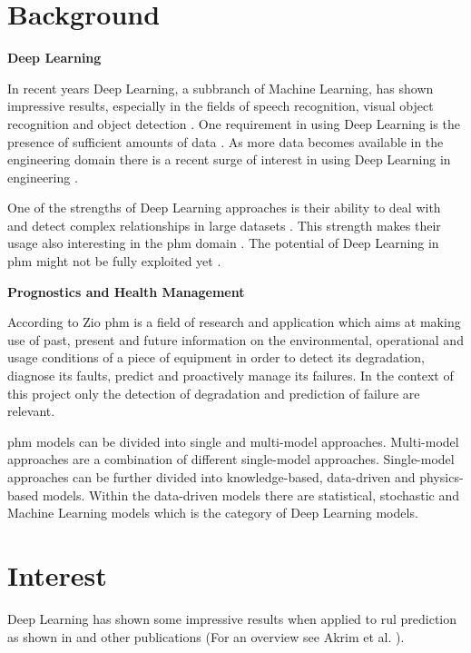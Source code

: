 \documentclass[conference]{IEEEtran}
\begin{document}
\IEEEpeerreviewmaketitle

\section{Background}
\label{sec:background}

\noindent
\textbf{Deep Learning}

In recent years Deep Learning, a subbranch of Machine Learning, has shown impressive results, especially in the fields of speech recognition, visual object recognition and object detection \cite{LeCun2015}. One requirement in using Deep Learning is the presence of sufficient amounts of data \cite{Sikorska2011}. As more data becomes available in the engineering domain there is a recent surge of interest in using Deep Learning in engineering \cite{Voulodimos2018}.

One of the strengths of Deep Learning approaches is their ability to deal with and detect complex relationships in large datasets \cite{MONTEROJIMENEZ2020539}. This strength makes their usage also interesting in the \gls{phm} domain \cite{Wu2015}. The potential of Deep Learning in \gls{phm} might not be fully exploited yet \cite{Akrim2021}.

\noindent
\textbf{Prognostics and Health Management}

According to Zio \cite{Zio2012} \gls{phm} is a field of research and application which aims at making use of past, present and future information on the environmental, operational and usage conditions of a piece of equipment in order to detect its degradation, diagnose its faults, predict and proactively manage its failures. In the context of this project only the detection of degradation and prediction of failure are relevant.

\gls{phm} models can be divided into single and multi-model approaches. Multi-model approaches are a combination of different single-model approaches. Single-model approaches can be further divided into knowledge-based, data-driven and physics-based models. Within the data-driven models there are statistical, stochastic and Machine Learning models which is the category of Deep Learning models. \cite{MONTEROJIMENEZ2020539}

\section{Interest}
\label{sec:interest}

Deep Learning has shown some impressive results when applied to \gls{rul} prediction as shown in \cite{Xu2018, Li2018, Liu2019, Yuan2016, Wu2018, Park2020} and other publications (For an overview see Akrim et al. \cite{Akrim2021}).
\end{document}
